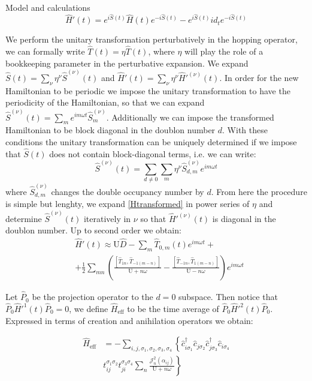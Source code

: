\documentclass[aps,prl,twocolumn,amsmath,amssymb,superscriptaddress,nobibnotes]{revtex4}%
\newcommand{\n}{\nonumber}
\begin{document}
\begin{section}{Model and calculations}
\begin{equation}
\hat{H}'(t) = e^{i\hat{S}(t)} \hat{H}(t) e^{-i\hat{S}(t)} - e^{i\hat{S}(t)} id_t e^{-i\hat{S}(t)}
\label{Htransformed}
\end{equation} 

We perform the unitary transformation perturbatively in the hopping operator, we can formally write $\hat{T}(t) = \eta \hat{T}(t)$, where $\eta$ will play the role of a bookkeeping parameter in the perturbative expansion. We expand $\hat{S}(t) = \sum_\nu \eta^\nu \hat{S}^{(\nu)}(t)$ and $\hat{H}'(t) = \sum_\nu \eta^\nu \hat{H}'^{(\nu)}(t)$. In order for the new Hamiltonian to be periodic we impose the unitary transformation to have the periodicity of the Hamiltonian, so that we can expand $\hat{S}^{(\nu)}(t) = \sum_m e^{im\omega t}\hat{S}^{(\nu)}_m$. Additionally we can impose the transformed Hamiltonian to be block diagonal in the doublon number $d$. With these conditions the unitary transformation can be uniquely determined if we impose that $\hat{S}(t)$ does not contain block-diagonal terms, i.e. we can write:
\begin{equation}
\hat{S}^{(\nu)}(t) = \sum_{d \neq 0} \sum_m \eta^\nu \hat{S}^{(\nu)}_{d,m} e^{im\omega t}
\end{equation}
where $\hat{S}^{(\nu)}_{d,m}$ changes the double occupancy number by $d$. From here the procedure is simple but lenghty, we expand \ref{Htransformed} in power series of $\eta$ and determine $\hat{S}^{(\nu)}(t)$ iteratively in $\nu$ so that $\hat{H}'^{(\nu)}(t)$ is diagonal in the doublon number. Up to second order we obtain:
\begin{align}
&\hat{H}'(t) \approx \text{U}\hat{D} - \sum_m \hat{T}_{0,m}(t)e^{im\omega t} + \n \\
&+ \frac{1}{2}\sum_{mn} \left( \frac{\left[\hat{T}_{1n}, \hat{T}_{-1(m-n)} \right]}{\text{U}+n\omega} - \frac{\left[\hat{T}_{-1n}, \hat{T}_{1(m-n)} \right]}{\text{U}-n\omega} \right) e^{im\omega t}
\end{align}

Let $\hat{P}_0$ be the projection operator to the $d=0$ subspace. Then notice that $\hat{P}_0\hat{H}'^{1}(t)\hat{P}_0 = 0$, we define $\hat{H}_{\text{eff}}$ to be the time average of $\hat{P}_0\hat{H}'^{2}(t)\hat{P}_0$. Expressed in terms of creation and anihilation operators we obtain:

\begin{align}
\hat{H}_{\text{eff}} &= - \sum_{i,j, \sigma_1, \sigma_2, \sigma_3, \sigma_4} \left\{ \hat{c}_{i \sigma_1}^\dagger \hat{c}_{j \sigma_2} \hat{c}_{j \sigma_3}^\dagger \hat{c}_{i \sigma_4} \right. \n \\
&t_{ij}^{\sigma_1 \sigma_2} t_{ji}^{\sigma_3 \sigma_4} \sum_{n} \frac{\mathcal{J}_{n}^2(\alpha_{ij})}{\text{U}+n\omega} \left. \right\} \label{GeneralHeff}
\end{align}


\end{section}
\end{document}
